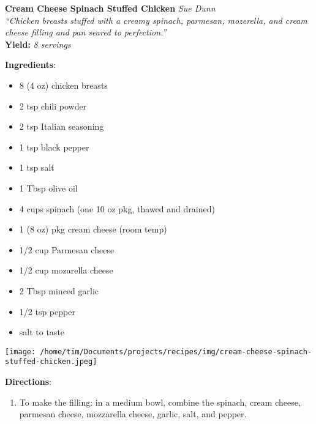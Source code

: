 \documentclass[11pt, twoside, openany]{book}
\begin{document}
\noindent\begin{minipage}[t]{\linewidth}%
{\Large\textbf{Cream Cheese Spinach Stuffed Chicken}} \label{cream-cheese-spinach-stuffed-chicken}\hfill\textit{Sue Dunn}\\
\textit{``Chicken breasts stuffed with a creamy spinach, parmesan, mozerella, and cream cheese filling and pan seared to perfection.''}\\
\textbf{Yield:} \textit{8 servings}\\
\noindent\begin{minipage}[t]{0.78\linewidth}%
\textbf{Ingredients}:\vspace{-3mm}
\begin{multicols}{2}
\begin{itemize}\setlength\itemsep{-1mm}
\item 8 (4 oz) chicken breasts
\item 2 tsp chili powder
\item 2 tsp Italian seasoning
\item 1 tsp black pepper
\item 1 tsp salt
\item 1 Tbsp olive oil
\item 4 cups spinach (one 10 oz pkg, thawed and drained)
\item 1 (8 oz) pkg cream cheese (room temp)
\item 1/2 cup Parmesan cheese
\item 1/2 cup mozarella cheese
\item 2 Tbsp minced garlic
\item 1/2 tsp pepper
\item salt to taste
\end{itemize}
\end{multicols}
\end{minipage}
\noindent\begin{minipage}[t]{0.18\linewidth}
\centering \strut\vspace*{-\baselineskip}\newline
\texttt{[image: /home/tim/Documents/projects/recipes/img/cream-cheese-spinach-stuffed-chicken.jpeg]}\\
\end{minipage}\vspace{3mm}
\textbf{Directions}:
\vspace{-3mm}\begin{enumerate}\setlength\itemsep{-1mm}
\item To make the filling: in a medium bowl, combine the spinach, cream cheese, parmesan cheese, mozzarella cheese, garlic, salt, and pepper.

\end{enumerate}
\end{minipage}
\end{document}
